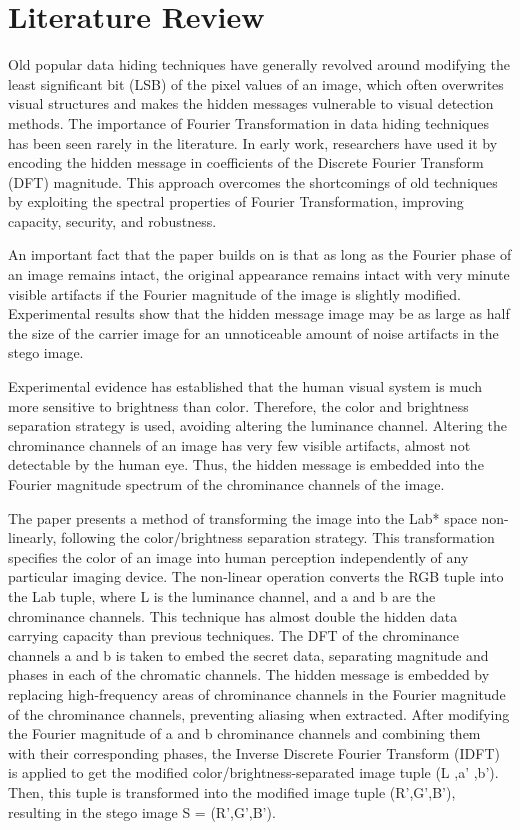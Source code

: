 \section{Literature Review}
\label{sec:LiteratureReview}

Old popular data hiding techniques have generally revolved around modifying the least significant bit (LSB) of the pixel values of an image, which often overwrites visual structures and makes the hidden messages vulnerable to visual detection methods. The importance of Fourier Transformation in data hiding techniques has been seen rarely in the literature. In early work, researchers have used it by encoding the hidden message in coefficients of the Discrete Fourier Transform (DFT) magnitude. This approach overcomes the shortcomings of old techniques by exploiting the spectral properties of Fourier Transformation, improving capacity, security, and robustness.

An important fact that the paper builds on is that as long as the Fourier phase of an image remains intact, the original appearance remains intact with very minute visible artifacts if the Fourier magnitude of the image is slightly modified. Experimental results show that the hidden message image may be as large as half the size of the carrier image for an unnoticeable amount of noise artifacts in the stego image.

Experimental evidence has established that the human visual system is much more sensitive to brightness than color. Therefore, the color and brightness separation strategy is used, avoiding altering the luminance channel. Altering the chrominance channels of an image has very few visible artifacts, almost not detectable by the human eye. Thus, the hidden message is embedded into the Fourier magnitude spectrum of the chrominance channels of the image.

The paper presents a method of transforming the image into the Lab* space non-linearly, following the color/brightness separation strategy. This transformation specifies the color of an image into human perception independently of any particular imaging device. The non-linear operation converts the RGB tuple into the Lab tuple, where L is the luminance channel, and a and b are the chrominance channels. This technique has almost double the hidden data carrying capacity than previous techniques. The DFT of the chrominance channels a and b is taken to embed the secret data, separating magnitude and phases in each of the chromatic channels. The hidden message is embedded by replacing high-frequency areas of chrominance channels in the Fourier magnitude of the chrominance channels, preventing aliasing when extracted. After modifying the Fourier magnitude of a and b chrominance channels and combining them with their corresponding phases, the Inverse Discrete Fourier Transform (IDFT) is applied to get the modified color/brightness-separated image tuple (L ,a' ,b'). Then, this tuple is transformed into the modified image tuple (R',G',B'), resulting in the stego image S = (R',G',B').

